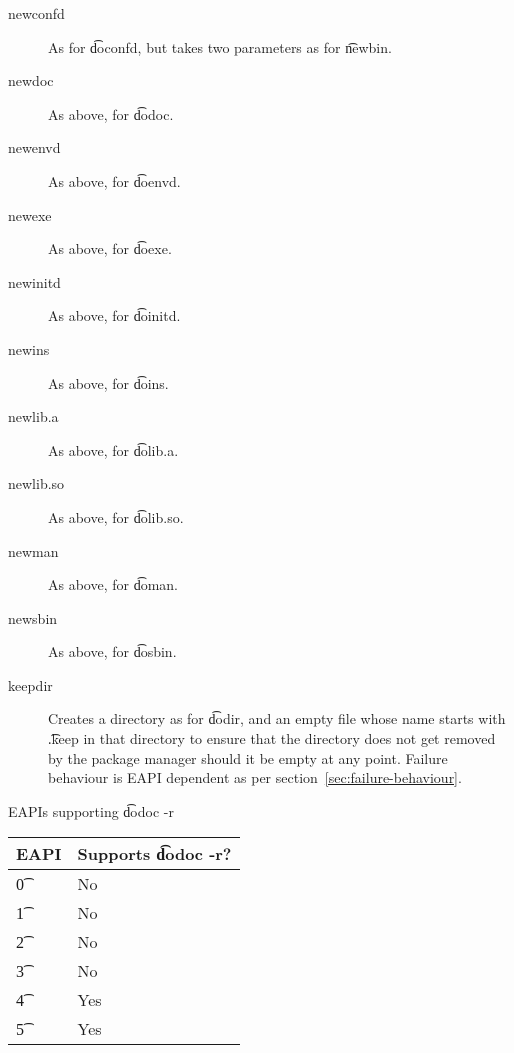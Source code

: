 \begin{description}
\item[newconfd] As for \t{doconfd}, but takes two parameters as for \t{newbin}.

\item[newdoc] As above, for \t{dodoc}.

\item[newenvd] As above, for \t{doenvd}.

\item[newexe] As above, for \t{doexe}.

\item[newinitd] As above, for \t{doinitd}.

\item[newins] As above, for \t{doins}.

\item[newlib.a] As above, for \t{dolib.a}.

\item[newlib.so] As above, for \t{dolib.so}.

\item[newman] As above, for \t{doman}.

\item[newsbin] As above, for \t{dosbin}.

\item[keepdir] Creates a directory as for \t{dodir}, and an empty file whose name starts with
    \t{.keep} in that directory to ensure that the directory does not get removed by the
    package manager should it be empty at any point. Failure behaviour is EAPI dependent as per
    section~\ref{sec:failure-behaviour}.

\end{description}

\begin{centertable}{EAPIs supporting \t{dodoc -r}} \label{tab:dodoc-table}
    \begin{tabular}{ l l }
        \toprule
            \multicolumn{1}{c}{\textbf{EAPI}} &
            \multicolumn{1}{c}{\textbf{Supports \t{dodoc -r}?}} \\
            \midrule
    \t{0} & No \\
    \t{1} & No \\
    \t{2} & No \\
    \t{3} & No \\
    \t{4} & Yes \\
    \t{5} & Yes \\
    \bottomrule
    \end{tabular}
\end{centertable}

